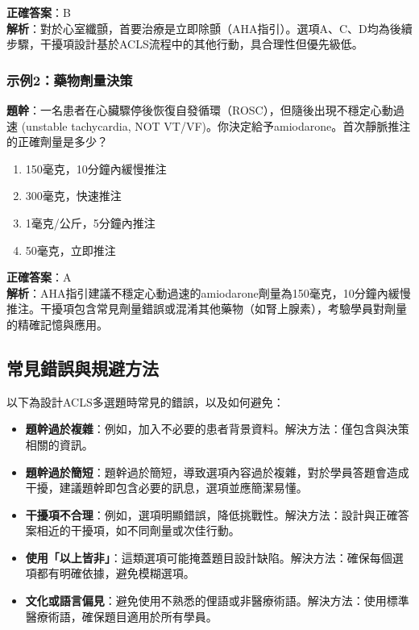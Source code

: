 \documentclass[12pt,a4paper]{article}
\begin{document}
\textbf{正確答案}：B \\
\textbf{解析}：對於心室纖顫，首要治療是立即除顫（AHA指引）。選項A、C、D均為後續步驟，干擾項設計基於ACLS流程中的其他行動，具合理性但優先級低。

\subsubsection{示例2：藥物劑量決策}
\textbf{題幹}：一名患者在心臟驟停後恢復自發循環（ROSC），但隨後出現不穩定心動過速 (unstable tachycardia, NOT VT/VF)。你決定給予amiodarone。首次靜脈推注的正確劑量是多少？

\begin{enumerate}[label=\Alph*.]
    \item 150毫克，10分鐘內緩慢推注
    \item 300毫克，快速推注
    \item 1毫克/公斤，5分鐘內推注
    \item 50毫克，立即推注
\end{enumerate}

\textbf{正確答案}：A \\
\textbf{解析}：AHA指引建議不穩定心動過速的amiodarone劑量為150毫克，10分鐘內緩慢推注。干擾項包含常見劑量錯誤或混淆其他藥物（如腎上腺素），考驗學員對劑量的精確記憶與應用。

\subsection{常見錯誤與規避方法}
以下為設計ACLS多選題時常見的錯誤，以及如何避免：

\begin{itemize}
    \item \textbf{題幹過於複雜}：例如，加入不必要的患者背景資料。解決方法：僅包含與決策相關的資訊。
    \item \textbf{題幹過於簡短}：題幹過於簡短，導致選項內容過於複雜，對於學員答題會造成干擾，建議題幹即包含必要的訊息，選項並應簡潔易懂。
    \item \textbf{干擾項不合理}：例如，選項明顯錯誤，降低挑戰性。解決方法：設計與正確答案相近的干擾項，如不同劑量或次佳行動。
    \item \textbf{使用「以上皆非」}：這類選項可能掩蓋題目設計缺陷。解決方法：確保每個選項都有明確依據，避免模糊選項。
    \item \textbf{文化或語言偏見}：避免使用不熟悉的俚語或非醫療術語。解決方法：使用標準醫療術語，確保題目適用於所有學員。
\end{itemize}
\end{document}
